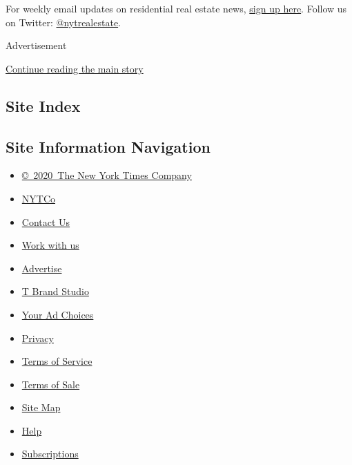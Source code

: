 For weekly email updates on residential real estate news,
\href{http://www.nytimes.com/newsletters/realestate/}{sign up here}.
Follow us on Twitter:
\href{https://twitter.com/nytrealestate}{@nytrealestate}.

Advertisement

\protect\hyperlink{after-bottom}{Continue reading the main story}

\hypertarget{site-index}{%
\subsection{Site Index}\label{site-index}}

\hypertarget{site-information-navigation}{%
\subsection{Site Information
Navigation}\label{site-information-navigation}}

\begin{itemize}
\tightlist
\item
  \href{https://help.nytimes.com/hc/en-us/articles/115014792127-Copyright-notice}{©~2020~The
  New York Times Company}
\end{itemize}

\begin{itemize}
\tightlist
\item
  \href{https://www.nytco.com/}{NYTCo}
\item
  \href{https://help.nytimes.com/hc/en-us/articles/115015385887-Contact-Us}{Contact
  Us}
\item
  \href{https://www.nytco.com/careers/}{Work with us}
\item
  \href{https://nytmediakit.com/}{Advertise}
\item
  \href{http://www.tbrandstudio.com/}{T Brand Studio}
\item
  \href{https://www.nytimes.com/privacy/cookie-policy\#how-do-i-manage-trackers}{Your
  Ad Choices}
\item
  \href{https://www.nytimes.com/privacy}{Privacy}
\item
  \href{https://help.nytimes.com/hc/en-us/articles/115014893428-Terms-of-service}{Terms
  of Service}
\item
  \href{https://help.nytimes.com/hc/en-us/articles/115014893968-Terms-of-sale}{Terms
  of Sale}
\item
  \href{https://spiderbites.nytimes.com}{Site Map}
\item
  \href{https://help.nytimes.com/hc/en-us}{Help}
\item
  \href{https://www.nytimes.com/subscription?campaignId=37WXW}{Subscriptions}
\end{itemize}
